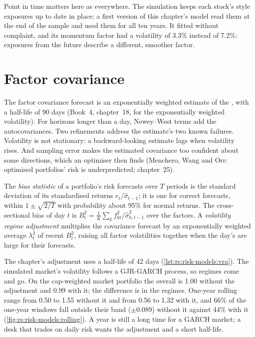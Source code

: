 Point in time matters here as everywhere. The simulation keeps each stock's style exposures up to date in place; a first version of this chapter's model read
them at the end of the sample and used them for all ten years. It fitted without complaint, and its momentum factor had a volatility of 3.3\% instead of 7.2\%:
exposures from the future describe a different, smoother factor.

\section{Factor covariance}

The factor covariance forecast is an exponentially weighted estimate of the , with a half-life of 90 days (Book~4, chapter~18, for the
exponentially weighted volatility). For horizons longer than a day, Newey--West terms add the autocovariances. Two refinements address the estimate's two
known failures. Volatility is not stationary: a backward-looking estimate lags when volatility rises. And sampling error makes the estimated covariance too
confident about some directions, which an optimiser then finds (Menchero, Wang and Orr: optimised portfolios' risk is underpredicted; chapter~25).

\begin{definition}\label{def:rs:risk-models:bias}
The \emph{bias statistic} of a portfolio's risk forecasts over $T$ periods is the standard deviation of its standardised returns
$r_t/\hat\sigma_{t-1}$; it is one for correct forecasts, within $1 \pm \sqrt{2/T}$ with probability about 95\% for normal returns. The cross-sectional bias of
day $t$ is $B_t^2 = \frac1K\sum_k f_{kt}^2/\hat\sigma_{k,t-1}^2$ over the factors. A \emph{volatility regime adjustment}
multiplies the covariance forecast by an exponentially weighted average $\lambda_t^2$ of recent $B_t^2$, raising all factor volatilities together when the day's
 are large for their forecasts.
\end{definition}

The chapter's adjustment uses a half-life of 42 days (\cref{lst:rs:risk-models:vra}). The simulated market's volatility follows a GJR-GARCH process, so regimes
come and go. On the cap-weighted market portfolio the overall  is 1.00 without the adjustment and 0.99 with it; the difference is in the regimes.
One-year rolling  range from 0.50 to 1.55 without it and from 0.56 to 1.32 with it, and 66\% of the one-year windows fall outside their band
($\pm 0.089$) without it against 44\% with it (\cref{fig:rs:risk-models:rolling}). A year is still a long time for a GARCH market; a desk that trades on daily
risk wants the adjustment and a short half-life.

